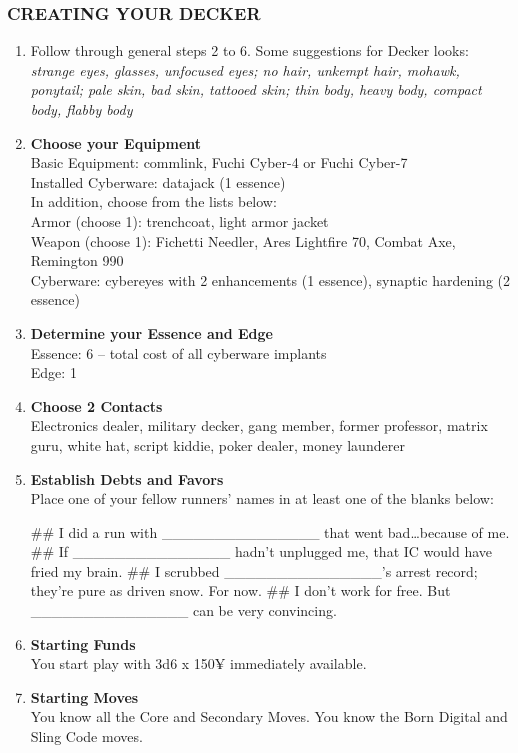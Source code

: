 \subsubsection{CREATING YOUR DECKER}
\begin{enumerate}
    \item Follow through general steps 2 to 6. Some suggestions for Decker looks: \textit{strange eyes, glasses, unfocused eyes; no hair, unkempt hair, mohawk, ponytail; pale skin, bad skin, tattooed skin; thin body, heavy body, compact body, flabby body}
    
    \item \textbf{Choose your Equipment} \\
    Basic Equipment: commlink, Fuchi Cyber-4 or Fuchi Cyber-7 \\
    Installed Cyberware: datajack (1 essence) \\
    In addition, choose from the lists below: \\
    Armor (choose 1): trenchcoat, light armor jacket \\
    Weapon (choose 1): Fichetti Needler, Ares Lightfire 70, Combat Axe, Remington 990 \\
    Cyberware: cybereyes with 2 enhancements (1 essence), synaptic hardening (2 essence)
    
    \item \textbf{Determine your Essence and Edge} \\
    Essence: 6 – total cost of all cyberware implants \\
    Edge: 1
    
    \item \textbf{Choose 2 Contacts} \\
    Electronics dealer, military decker, gang member, former professor, matrix guru, white hat, script kiddie, poker dealer, money launderer
    
    \item \textbf{Establish Debts and Favors} \\
    Place one of your fellow runners’ names in at least one of the blanks below:
        \begin{easylist}
            ## I did a run with \_\_\_\_\_\_\_\_\_\_\_\_\_\_\_ that went bad…because of me.
            ## If \_\_\_\_\_\_\_\_\_\_\_\_\_\_\_ hadn’t unplugged me, that IC would have fried my brain.
            ## I scrubbed \_\_\_\_\_\_\_\_\_\_\_\_\_\_\_’s arrest record; they’re pure as driven snow. For now.
            ## I don’t work for free. But \_\_\_\_\_\_\_\_\_\_\_\_\_\_\_ can be very convincing.
        \end{easylist}
    
    \item \textbf{Starting Funds} \\
    You start play with 3d6 x 150¥ immediately available.
    
    \item \textbf{Starting Moves} \\
    You know all the Core and Secondary Moves. You know the Born Digital and Sling Code moves.
\end{enumerate}

